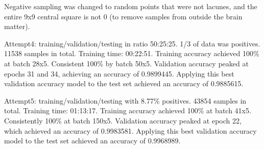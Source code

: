 Negative sampling was changed to random points that were not lacunes, and the entire 9x9 central square is not 0 (to remove samples from outside the brain matter). 


Attempt4: training/validation/testing in ratio 50:25:25. 1/3 of data was positives. 11538 samples in total. Training time: 00:22:51.
Training accuracy achieved 100\% at batch 28x5. Consistent 100\% by batch 50x5. Validation accuracy peaked at epochs 31 and 34, achieving an accuracy of 0.9899445. Applying this best validation accuracy model to the test set achieved an accuracy of 0.9885615.

Attempt5: training/validation/testing with 8.77\% positives. 43854 samples in total. Training time: 01:13:17. Training accuracy achieved 100\% at batch 41x5. Consistently 100\% at batch 150x5. Validation accuracy peaked at epoch 22, which achieved an accuracy of 0.9983581. Applying this best validation accuracy model to the test set achieved an accuracy of 0.9968989.



%